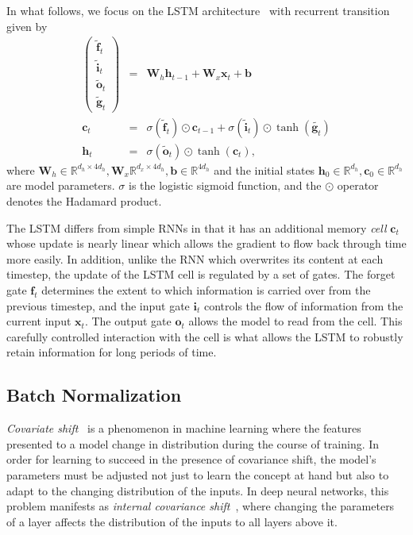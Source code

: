 \documentclass{article} %
\newcommand{\vect}[1]{\mathbf{#1}}
\newcommand{\mat}[1]{\mathbf{#1}}
\newcommand{\ewprod}{\odot}
\newcommand{\reals}{\mathbb{R}}
\begin{document}
In what follows, we focus on the LSTM architecture~\cite{lstm} with recurrent transition given by
\begin{eqnarray}
\left(\begin{array}{ccc}
\tilde{\vect{f}}_t \\
\tilde{\vect{i}}_t \\
\tilde{\vect{o}}_t \\
\tilde{\vect{g}}_t
\end{array}\right)
 &=&
 \mat{W}_h \vect{h}_{t-1} +
 \mat{W}_x \vect{x}_t +
 \vect{b}
 \\
\vect{c}_t &= &\sigma(\tilde{\vect{f}}_t) \ewprod \vect{c}_{t-1} +
\sigma(\tilde{\vect{i}}_t) \ewprod \tanh(\tilde{\vect{g}_t}) \\
\vect{h}_t &= &\sigma(\tilde{\vect{o}}_t) \ewprod \tanh(\vect{c}_t),
\end{eqnarray}
where $\vect{W}_h \in \reals^{d_h \times 4 d_h}, \vect{W}_x \reals^{d_x \times 4 d_h}, \vect{b} \in \reals^{4 d_h}$
and the initial states $\vect{h}_0 \in \reals^{d_h}, \vect{c}_0 \in \reals^{d_h}$ %
are model parameters.
$\sigma$ is the logistic sigmoid function, and the $\ewprod$ operator denotes the Hadamard product.

The LSTM differs from simple RNNs in that it has an additional memory \emph{cell} 
$\vect{c}_t$ whose update is nearly linear which allows the gradient to flow back 
through time more easily. In addition, unlike the RNN which overwrites its content 
at each timestep, the update of the LSTM cell is regulated by a set of gates.
The forget gate $\vect{f}_t$ determines the extent to which information is carried over from the previous timestep,
and the input gate $\vect{i}_t$ controls the flow of information from the current input $\vect{x}_t$.
The output gate $\vect{o}_t$ allows the model to read from the cell. This carefully 
controlled interaction with the cell is what allows the LSTM to robustly retain 
information for long periods of time.

\subsection{Batch Normalization}

\emph{Covariate shift}~\cite{shimodaira2000improving} is a phenomenon in machine learning where
the features presented to a model change in distribution during the course of training.
In order for learning to succeed in the presence of covariance shift,
the model's parameters must be adjusted not just to learn the concept at hand
but also to adapt to the changing distribution of the inputs.
In deep neural networks, this problem manifests as \emph{internal covariance shift}~\cite{batchnorm},
where changing the parameters of a layer affects the distribution of the inputs to all layers above it.
\end{document}
